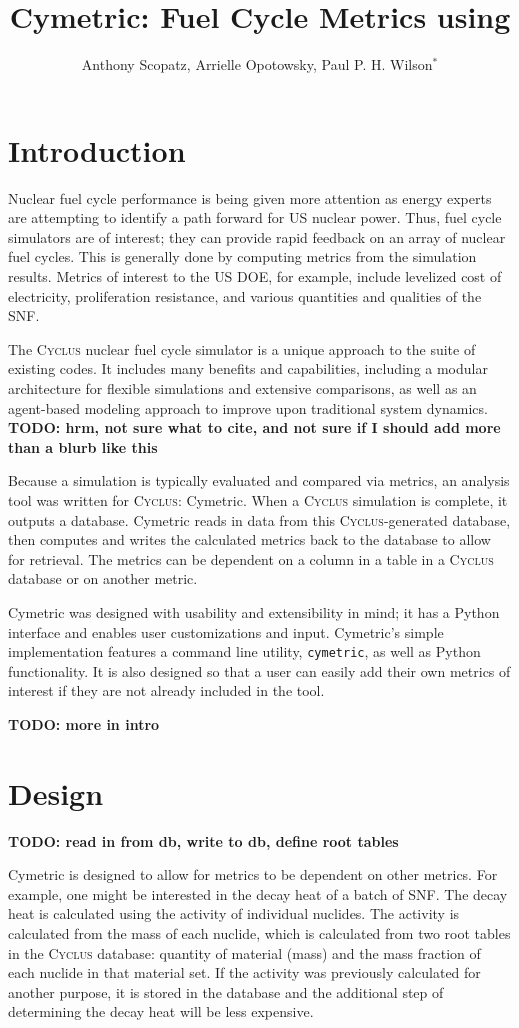 \documentclass{anstrans}
\title{Cymetric: Fuel Cycle Metrics using \cyclus}
\author{Anthony Scopatz, Arrielle Opotowsky, Paul P. H. Wilson$^{*}$}
\institute{
$^{*}$Department of Engineering Physics, University of Wisconsin - Madison, 
1500 Engineering Drive, Madison WI 53703
}
\newcommand{\cyclus}{\textsc{Cyclus}\xspace}
\newcommand{\TODO}[1] {{\color{red}\textbf{TODO: #1}}}
\newcommand{\code}[1]{{\color{code}\texttt{#1}}}
\begin{document}
\section{Introduction}
Nuclear fuel cycle performance is being given more attention as energy experts are attempting to identify a path forward for \gls{US} nuclear power. Thus, fuel cycle simulators are of interest; they can provide rapid feedback on an array of nuclear fuel cycles. This is generally done by computing metrics from the simulation results. Metrics of interest to the \gls{US} \gls{DOE}, for example, include levelized cost of electricity, proliferation resistance, and various quantities and qualities of the \gls{SNF}.

The \cyclus nuclear fuel cycle simulator is a unique approach to the suite of existing codes. It includes many benefits and capabilities, including a modular architecture for flexible simulations and extensive comparisons, as well as an agent-based modeling approach to improve upon traditional system dynamics. \TODO{hrm, not sure what to cite, and not sure if I should add more than a blurb like this}

Because a simulation is typically evaluated and compared via metrics, an analysis tool was written for \cyclus : Cymetric. When a \cyclus simulation is complete, it outputs a database. Cymetric reads in data from this \cyclus -generated database, then computes and writes the calculated metrics back to the database to allow for retrieval. The metrics can be dependent on a column in a table in a \cyclus database or on another metric.

Cymetric was designed with usability and extensibility in mind; it has a Python interface and enables user customizations and input. Cymetric's simple implementation  features a command line utility, \code{cymetric}, as well as Python functionality. It is also designed so that a user can easily add their own metrics of interest if they are not already included in the tool. 

\TODO{more in intro}

\section{Design}
\TODO{ read in from db, write to db, define root tables}

Cymetric is designed to allow for metrics to be dependent on other metrics. For example, one might be interested in the decay heat of a batch of \gls{SNF}. The decay heat is calculated using the activity of individual nuclides. The activity is calculated from the mass of each nuclide, which is calculated from two root tables in the \cyclus database: quantity of material (mass) and the mass fraction of each nuclide in that material set. If the activity was previously calculated for another purpose, it is stored in the database and the additional step of determining the decay heat will be less expensive. 
\end{document}
